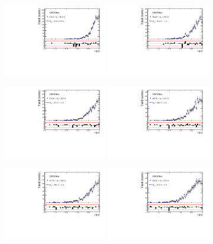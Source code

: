 \begin{figure}[h]
\centering
\includegraphics[height=!,width=0.4\textwidth]{figs/Resolution/SignalData_bin_1.pdf}
\includegraphics[height=!,width=0.4\textwidth]{figs/Resolution/SignalData_bin_2.pdf}

\includegraphics[height=!,width=0.4\textwidth]{figs/Resolution/SignalData_bin_3.pdf}
\includegraphics[height=!,width=0.4\textwidth]{figs/Resolution/SignalData_bin_4.pdf}

\includegraphics[height=!,width=0.4\textwidth]{figs/Resolution/SignalData_bin_5.pdf}
\includegraphics[height=!,width=0.4\textwidth]{figs/Resolution/SignalData_bin_6.pdf}


\end{figure}
